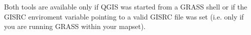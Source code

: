 Both tools are available only if QGIS was started from a GRASS 
shell or if the GISRC enviroment variable pointing to a
valid GISRC file was set (i.e. only if you are running 
GRASS within your mapset).

